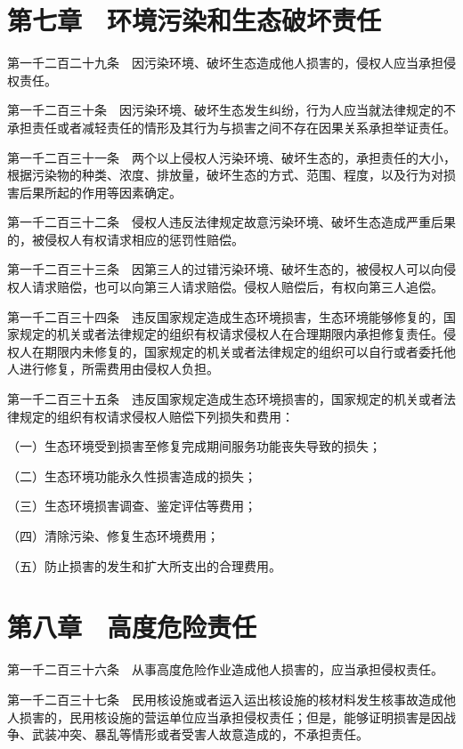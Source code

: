 \documentclass[UTF8,12pt,a4paper]{ctexbook}
\begin{document}
\section*{第七章　环境污染和生态破坏责任}

第一千二百二十九条　因污染环境、破坏生态造成他人损害的，侵权人应当承担侵权责任。

第一千二百三十条　因污染环境、破坏生态发生纠纷，行为人应当就法律规定的不承担责任或者减轻责任的情形及其行为与损害之间不存在因果关系承担举证责任。

第一千二百三十一条　两个以上侵权人污染环境、破坏生态的，承担责任的大小，根据污染物的种类、浓度、排放量，破坏生态的方式、范围、程度，以及行为对损害后果所起的作用等因素确定。

第一千二百三十二条　侵权人违反法律规定故意污染环境、破坏生态造成严重后果的，被侵权人有权请求相应的惩罚性赔偿。

第一千二百三十三条　因第三人的过错污染环境、破坏生态的，被侵权人可以向侵权人请求赔偿，也可以向第三人请求赔偿。侵权人赔偿后，有权向第三人追偿。

第一千二百三十四条　违反国家规定造成生态环境损害，生态环境能够修复的，国家规定的机关或者法律规定的组织有权请求侵权人在合理期限内承担修复责任。侵权人在期限内未修复的，国家规定的机关或者法律规定的组织可以自行或者委托他人进行修复，所需费用由侵权人负担。

第一千二百三十五条　违反国家规定造成生态环境损害的，国家规定的机关或者法律规定的组织有权请求侵权人赔偿下列损失和费用：

（一）生态环境受到损害至修复完成期间服务功能丧失导致的损失；

（二）生态环境功能永久性损害造成的损失；

（三）生态环境损害调查、鉴定评估等费用；

（四）清除污染、修复生态环境费用；

（五）防止损害的发生和扩大所支出的合理费用。

\section*{第八章　高度危险责任}

第一千二百三十六条　从事高度危险作业造成他人损害的，应当承担侵权责任。

第一千二百三十七条　民用核设施或者运入运出核设施的核材料发生核事故造成他人损害的，民用核设施的营运单位应当承担侵权责任；但是，能够证明损害是因战争、武装冲突、暴乱等情形或者受害人故意造成的，不承担责任。
\end{document}

